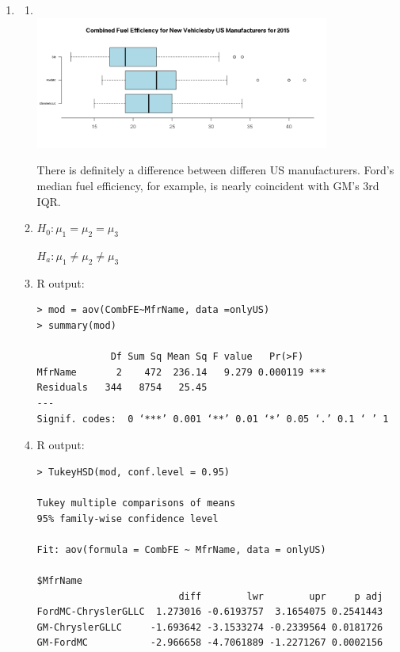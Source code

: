 \documentclass[12pt,letterpaper]{article}
\begin{document}
\begin{enumerate}
  \item
    \begin{enumerate}
      \item \hfill\\ \includegraphics[width=0.8\textwidth]{2a.png}

        There is definitely a difference between differen US manufacturers.
        Ford's median fuel efficiency, for example, is nearly coincident with
        GM's 3rd IQR.

      \item $H_0: \mu_1 = \mu_2 = \mu_3$

        $H_a: \mu_1 \ne \mu_2 \ne \mu_3$

      \item R output:
        \begin{verbatim}
> mod = aov(CombFE~MfrName, data =onlyUS)
> summary(mod)

             Df Sum Sq Mean Sq F value   Pr(>F)    
MfrName       2    472  236.14   9.279 0.000119 ***
Residuals   344   8754   25.45                     
---
Signif. codes:  0 ‘***’ 0.001 ‘**’ 0.01 ‘*’ 0.05 ‘.’ 0.1 ‘ ’ 1
        \end{verbatim}

      \item R output:
        \begin{verbatim}
> TukeyHSD(mod, conf.level = 0.95)

Tukey multiple comparisons of means
95% family-wise confidence level

Fit: aov(formula = CombFE ~ MfrName, data = onlyUS)

$MfrName
                         diff        lwr        upr     p adj
FordMC-ChryslerGLLC  1.273016 -0.6193757  3.1654075 0.2541443
GM-ChryslerGLLC     -1.693642 -3.1533274 -0.2339564 0.0181726
GM-FordMC           -2.966658 -4.7061889 -1.2271267 0.0002156
        \end{verbatim}
    \end{enumerate}
\end{enumerate}
\end{document}
